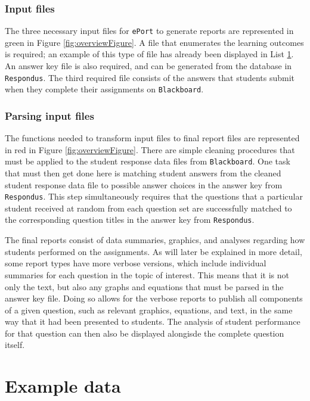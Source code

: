 \documentclass{article}\usepackage[]{graphicx}\usepackage[]{color}
\numberwithin{equation}{section} %
\begin{document}
\subsubsection{Input files}

The three necessary input files for \texttt{ePort} to generate reports are represented in green in Figure \ref{fig:overviewFigure}. A file that enumerates the learning outcomes is required; an example of this type of file has already been displayed in List \hyperref[sec:lo]{1}. An answer key file is also required, and can be generated from the database in \texttt{Respondus}. The third required file consists of the answers that students submit when they complete their assignments on \texttt{Blackboard}.

\subsubsection{Parsing input files}

The functions needed to transform input files to final report files are represented in red in Figure \ref{fig:overviewFigure}. There are simple cleaning procedures that must be applied to the student response data files from \texttt{Blackboard}. One task that must then get done here is matching student answers from the cleaned student response data file to possible answer choices in the answer key from \texttt{Respondus}. This step simultaneously requires that the questions that a particular student received at random from each question set are successfully matched to the corresponding question titles in the answer key from \texttt{Respondus}.

The final reports consist of data summaries, graphics, and analyses regarding how students performed on the assignments. As will later be explained in more detail, some report types have more verbose versions, which include individual summaries for each question in the topic of interest. This means that it is not only the text, but also any graphs and equations that must be parsed in the answer key file. Doing so allows for the verbose reports to publish all components of a given question, such as relevant graphics, equations, and text, in the same way that it had been presented to students. The analysis of student performance for that question can then also be displayed alongisde the complete question itself.

\section{Example data}
\end{document}
